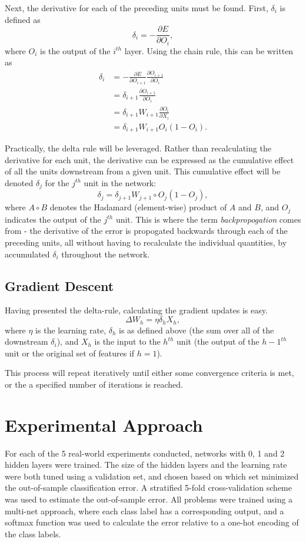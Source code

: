 \documentclass{amsart}
\begin{document}
    Next, the derivative for each of the preceding units
    must be found. First, $\delta_i$ is defined as
    \[
        \delta_i = -\frac{\partial E}{\partial O_i},
    \]
    where $O_i$ is the output of the $i^{th}$ layer.
    Using the chain rule, this can be written as
    \begin{align*}
        \delta_i &= - \frac{\partial E}{\partial O_{i+1}}
        \frac{\partial O_{i+1}}{\partial O_{i}} \\
        &= \delta_{i+1}  \frac{\partial O_{i+1}}{\partial O_{i}} \\
        &= \delta_{i+1} W_{i+1} \frac{\partial O_i}{\partial X_i} \\
        &= \delta_{i+1} W_{i+1} O_i (1 - O_i).
    \end{align*}

    Practically, the delta rule will be leveraged.
    Rather than recalculating the derivative for each unit,
    the derivative can be expressed as the cumulative effect of
    all the units downstream from a given unit. This cumulative
    effect will be denoted $\delta_j$ for the $j^{th}$ unit in the network:
    \[
        \delta_j = \delta_{j+1} W_{j+1} \circ  O_j (1 - O_j),
    \]
    where $A \circ B$ denotes the Hadamard (element-wise) product of $A$ and $B$,
    and $O_j$ indicates the output of the $j^{th}$ unit. This is where
    the term \textit{backpropogation} comes from - the derivative of the error
    is propogated backwards through each of the preceding units, all without
    having to recalculate the individual quantities, by accumulated
    $\delta_i$ throughout the network.

    \subsection*{Gradient Descent}
    Having presented the delta-rule, calculating the gradient updates is easy.
    \[
        \Delta W_h = \eta \delta_h X_h,
    \]
    where $\eta$ is the learning rate, $\delta_h$ is as defined above (the sum
    over all of the downstream $\delta_i$), and $X_h$ is the input to the $h^{th}$
    unit (the output of the $h-1^{th}$ unit or the original set of features if
    $h=1$).

    This process will repeat iteratively until either some convergence criteria is
    met, or the a specified number of iterations is reached.

    \section{Experimental Approach}
    For each of the 5 real-world experiments conducted, networks with 0, 1 and 2 hidden
    layers were trained. The size of the hidden layers and the
    learning rate were both tuned using a validation set, and chosen based on which
    set minimized the out-of-sample classification error.
    A stratified 5-fold cross-validation scheme was used to estimate
    the out-of-sample error. All problems were trained using a multi-net approach, where each
    class label has a corresponding output, and a softmax function was used to calculate
    the error relative to a one-hot encoding of the class labels.
\end{document}
